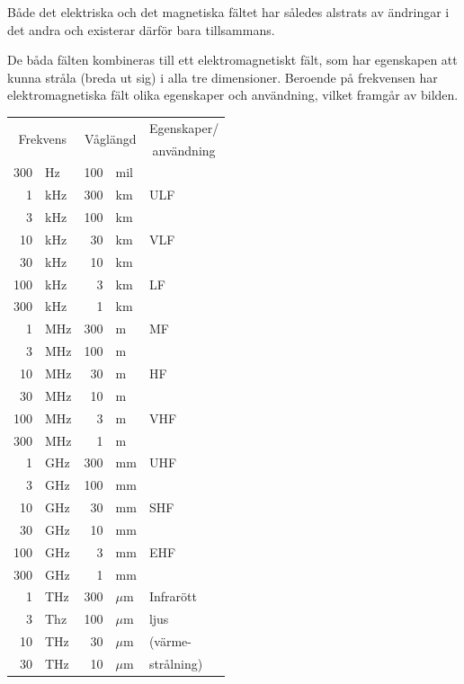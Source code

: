 Både det elektriska och det magnetiska fältet har således alstrats av ändringar
i det andra och existerar därför bara tillsammans.

De båda fälten kombineras till ett elektromagnetiskt fält, som har egenskapen
att kunna stråla (breda ut sig) i alla tre dimensioner. Beroende på frekvensen
har elektromagnetiska fält olika egenskaper och användning, vilket framgår av
bilden.

\begin{center}
\begin{tabular}{|rl|rl|l|}
\hline
\multicolumn{2}{|c|}{\multirow{2}{*}{Frekvens}} & \multicolumn{2}{|c|}{\multirow{2}{*}{Våglängd}} & \multicolumn{1}{|c|}{Egenskaper/} \\
 & & & & \multicolumn{1}{|c|}{användning} \\ \hline
300 & Hz  & 100 & mil & \\
  1 & kHz & 300 & km & ULF \\ \cline{5-5}
  3 & kHz & 100 & km & \\
 10 & kHz &  30 & km & VLF \\ \cline{5-5}
 30 & kHz &  10 & km & \\
100 & kHz &   3 & km & LF \\ \cline{5-5}
300 & kHz &   1 & km & \\
  1 & MHz & 300 & m & MF \\ \cline{5-5}
  3 & MHz & 100 & m & \\
 10 & MHz &  30 & m & HF \\ \cline{5-5}
 30 & MHz &  10 & m & \\
100 & MHz &   3 & m & VHF \\ \cline{5-5}
300 & MHz &   1 & m & \\
  1 & GHz & 300 & mm & UHF \\ \cline{5-5}
  3 & GHz & 100 & mm & \\
 10 & GHz &  30 & mm & SHF \\ \cline{5-5}
 30 & GHz &  10 & mm & \\
100 & GHz &   3 & mm & EHF\\ \cline{5-5}
300 & GHz &   1 & mm & \\\
  1 & THz & 300 & \(\mu\)m & Infrarött \\
  3 & Thz & 100 & \(\mu\)m & ljus \\
 10 & THz &  30 & \(\mu\)m & (värme- \\
 30 & THz &  10 & \(\mu\)m & strålning) \\

\end{tabular}
\end{center}
